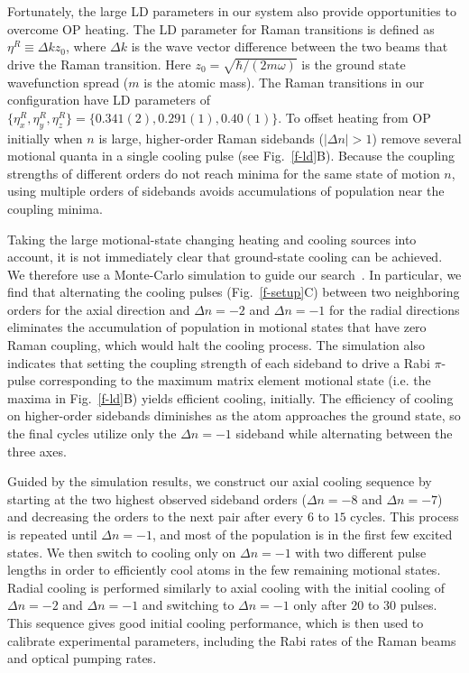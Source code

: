 \documentclass[aps,prl,twocolumn,groupedaddress]{revtex4-1}
\begin{document}
Fortunately, the large LD parameters in our system also provide opportunities to overcome OP heating.
The LD parameter for Raman transitions is defined as $\eta^R\equiv\Delta k z_0$,
where $\Delta k$ is the wave vector difference
between the two beams that drive the Raman transition.  Here $z_0=\sqrt{\hbar/(2 m \omega)}$ is the ground state wavefunction spread ($m$ is the atomic mass).
The Raman transitions in our configuration have LD parameters of
$\{\eta^R_x,\eta^R_y,\eta^R_z\} = \{0.341(2), 0.291(1), 0.40(1)\}$.
To offset heating from OP initially when $n$ is large, higher-order Raman sidebands ($|\Delta n| > 1$)   remove several motional quanta in a single cooling pulse (see Fig.~\ref{f-ld}B).
Because the coupling strengths of different orders do not reach minima for the same state of motion $n$,
using multiple orders of sidebands avoids accumulations of population
near the coupling minima.

Taking the large motional-state changing heating and cooling sources
 into account,
it is not immediately clear that ground-state cooling can be achieved.
We therefore use a Monte-Carlo simulation to guide our search~\cite{Dalibard1992}.
In particular, we find that alternating the cooling pulses (Fig.~\ref{f-setup}C) between two
neighboring orders for the axial direction and $\Delta n=-2$ and $\Delta n=-1$ for the radial directions
eliminates the accumulation of population in motional states that have zero Raman coupling, which would halt the cooling process.
The simulation also indicates that setting the coupling strength of each sideband
to drive a Rabi $\pi$-pulse corresponding to the maximum matrix element motional state
(i.e. the maxima in Fig.~\ref{f-ld}B)  yields efficient cooling, initially.
The efficiency of cooling on higher-order sidebands diminishes
as the atom approaches the ground state, so the final cycles utilize only the $\Delta n=-1$ sideband while alternating between the three axes.

Guided by the simulation results,
we construct our axial cooling sequence by starting at the two highest
observed sideband orders ($\Delta n=-8$ and $\Delta n=-7$)
and decreasing the orders to the next pair after every $6$ to $15$ cycles.
This process is repeated until $\Delta n=-1$, and most of the
population is in the first few excited states. We then switch to cooling only on $\Delta n=-1$ with two different pulse lengths in order to efficiently cool atoms in the
few remaining motional states.
Radial cooling is performed similarly to axial cooling with the initial cooling of $\Delta n=-2$ and $\Delta n=-1$ and switching to $\Delta n=-1$ only after $20$ to $30$ pulses.
This sequence gives good initial cooling performance, which is then used to calibrate experimental
parameters, including the Rabi rates of the Raman beams and optical pumping rates.
\end{document}
